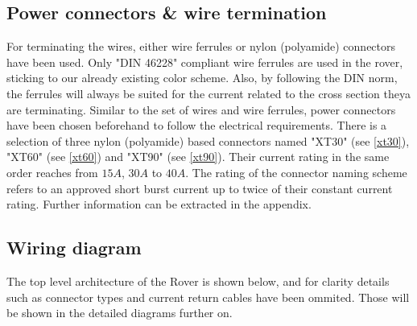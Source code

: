 
    \clearpage %

    \subsection{Power connectors \& wire termination}

    
    For terminating the wires, either wire ferrules or nylon (polyamide) connectors have been used. Only "DIN 46228" compliant wire ferrules are used in the rover, sticking to our already existing color scheme. Also, by following the DIN norm, the ferrules will always be suited for the current related to the cross section theya are terminating. Similar to the set of wires and wire ferrules, power connectors have been chosen beforehand to follow the electrical requirements. There is a selection of three nylon (polyamide) based connectors named "XT30" (see \ref{xt30}), "XT60" (see \ref{xt60}) and "XT90" (see \ref{xt90}). Their current rating in the same order reaches from $15A$, $30A$ to $40A$. The rating of the connector naming scheme refers to an approved short burst current up to twice of their constant current rating. Further information can be extracted in the appendix.

    \clearpage %

    \subsection{Wiring diagram}

    The top level architecture of the Rover is shown below, and for clarity details such as connector types and current return cables have been ommited. Those will be shown in the detailed diagrams further on. 

